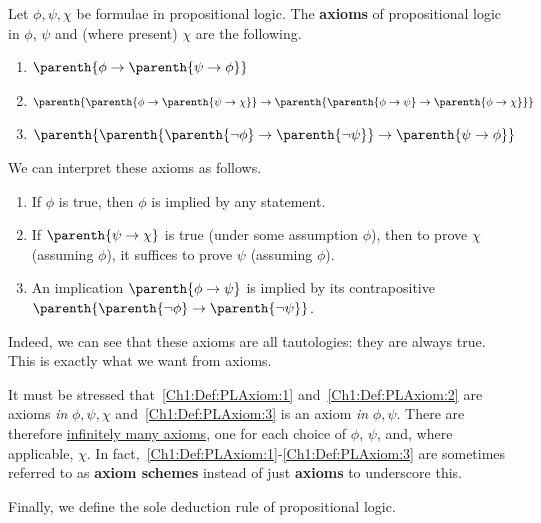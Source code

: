 \begin{boxdefinition}\label{Ch1:Def:FormalPropAxioms}
    Let $\phi, \psi, \chi$ be formulae in propositional logic. The \textbf{axioms} of propositional logic in $\phi$, $\psi$ and (where present) $\chi$ are the following.
    \begin{enumerate}[label = (A\arabic*)]
        \item\label{Ch1:Def:PLAxiom:1} $\parenth{\phi \to \parenth{\psi \to \phi}}$
        \item\label{Ch1:Def:PLAxiom:2} $\parenth{\parenth{\phi \to \parenth{\psi \to \chi}} \to \parenth{\parenth{\phi \to \psi} \to \parenth{\phi \to \chi}}}$
        \item\label{Ch1:Def:PLAxiom:3} $\parenth{\parenth{\parenth{\neg \phi} \to \parenth{\neg \psi}} \to \parenth{\psi \to \phi}}$
    \end{enumerate}
\end{boxdefinition}

We can interpret these axioms as follows.
\begin{enumerate}[label =~\ref{Ch1:Def:PLAxiom:\arabic*}, noitemsep]
    \item If $\phi$ is true, then $\phi$ is implied by any statement.
    \item If $\parenth{\psi \to \chi}$ is true (under some assumption $\phi$), then to prove $\chi$ (assuming $\phi$), it suffices to prove $\psi$ (assuming $\phi$).
    \item An implication $\parenth{\phi \to \psi}$ is implied by its contrapositive $\parenth{\parenth{\neg \phi} \to \parenth{\neg \psi}}$.
\end{enumerate}
Indeed, we can see that these axioms are all tautologies: they are always true. This is exactly what we want from axioms.

\begin{remark}
    It must be stressed that~\ref{Ch1:Def:PLAxiom:1} and~\ref{Ch1:Def:PLAxiom:2} are axioms \textit{in} $\phi, \psi, \chi$ and~\ref{Ch1:Def:PLAxiom:3} is an axiom \textit{in} $\phi, \psi$. There are therefore \underline{infinitely many axioms}, one for each choice of $\phi$, $\psi$, and, where applicable, $\chi$. In fact,~\ref{Ch1:Def:PLAxiom:1}-\ref{Ch1:Def:PLAxiom:3} are sometimes referred to as \textbf{axiom schemes} instead of just \textbf{axioms} to underscore this.
\end{remark}

Finally, we define the sole deduction rule of propositional logic.

